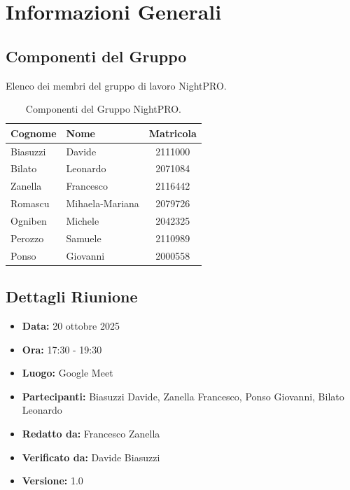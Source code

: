 \documentclass[a4paper, 11pt, oneside]{scrartcl} %
\begin{document}
\newpage
\tableofcontents %
\pagestyle{fancy} %

\newpage
\section{Informazioni Generali}

\subsection{Componenti del Gruppo}
Elenco dei membri del gruppo di lavoro NightPRO.

\begin{table}[h!]
\centering
\begin{tabular}{@{}llc@{}}
\toprule
\textbf{Cognome} & \textbf{Nome} & \textbf{Matricola} \\
\midrule
Biasuzzi & Davide & 2111000 \\
Bilato & Leonardo & 2071084 \\
Zanella & Francesco & 2116442 \\
Romascu & Mihaela-Mariana & 2079726 \\
Ogniben & Michele & 2042325 \\
Perozzo & Samuele & 2110989 \\
Ponso & Giovanni & 2000558 \\
\bottomrule
\end{tabular}
\caption{Componenti del Gruppo NightPRO.}
\end{table}

\subsection{Dettagli Riunione}
\begin{itemize}
    \item \textbf{Data:} 20 ottobre 2025
    \item \textbf{Ora:} 17:30 - 19:30
    \item \textbf{Luogo:} Google Meet
    \item \textbf{Partecipanti:} Biasuzzi Davide, Zanella Francesco, Ponso Giovanni, Bilato Leonardo
    \item  \textbf{Redatto da: } Francesco Zanella
    \item  \textbf{Verificato da:} Davide Biasuzzi
    \item \textbf{Versione: } 1.0
\end{itemize}
\end{document}
